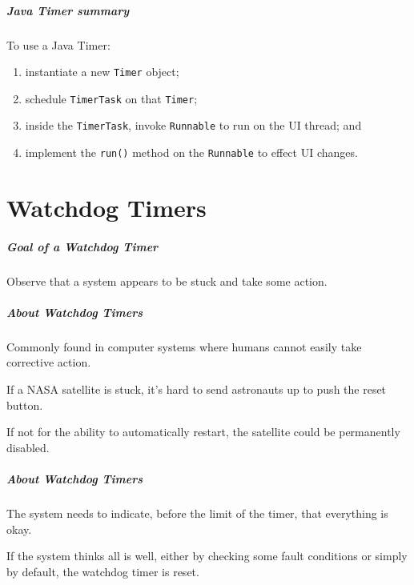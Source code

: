 \begin{frame}

\frametitle{Java Timer summary}

\begin{changemargin}{1cm}
\large
To use a Java Timer:
\begin{enumerate}
\item instantiate a new {\tt Timer} object;
\item schedule {\tt TimerTask} on that {\tt Timer};
\item inside the {\tt TimerTask}, invoke {\tt Runnable} to run on the
UI thread; and
\item implement the {\tt run()} method on the {\tt Runnable} to effect
  UI changes.  
\end{enumerate}
\end{changemargin}

\end{frame}

\part{Watchdog Timers}
\frame{\partpage}

\begin{frame}

\frametitle{Goal of a Watchdog Timer}

\Large
\begin{changemargin}{1cm}
Observe that a system appears to
be stuck and take some action.
\end{changemargin}

\end{frame}

\begin{frame}
\frametitle{About Watchdog Timers}
\begin{changemargin}{1cm}
Commonly found in computer systems where humans cannot easily take corrective action.

If a NASA satellite is stuck, it's hard to send astronauts up to push the reset button.

If not for the ability to automatically restart, the satellite could be permanently disabled.

\end{changemargin}
\end{frame}

\begin{frame}
\frametitle{About Watchdog Timers}
\begin{changemargin}{1cm}

The system needs to indicate, before the limit of the timer, that everything is okay. 

If the system thinks all is well, either by checking some fault conditions or simply by default, the watchdog timer is reset. 


\end{changemargin}
\end{frame}


